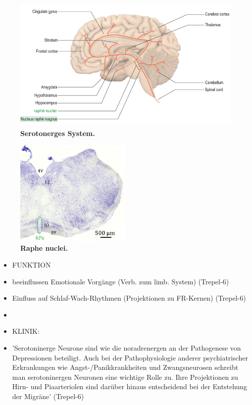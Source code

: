 \documentclass[12pt,a4paper,pdftex]{article}
\begin{document}
\begin{figure}[H]
    \centering
    \includegraphics[width=\textwidth]{pictures/Bilder_monoamine_systeme/serotonerges_system.PNG}
    \caption[Serotonerges System]{\textbf{Serotonerges System.} \textsuperscript{\cite[9]{crossman2014neuroanatomy}}}
    \label{fig:serotonerges_system}
\end{figure}{}
    
\begin{figure}[H]
    \centering
    \includegraphics[width=0.5\textwidth]{pictures/Bilder_monoamine_systeme/raphe_nuclei.png}
    \caption[Raphe nuclei]{\textbf{Raphe nuclei.} }
    \label{fig:raphe_nuclei}
\end{figure}{}


\begin{itemize}{}
    \item FUNKTION
    \item beeinflussen Emotionale Vorgänge (Verb. zum limb. System) (Trepel-6)
    \item Einfluss auf Schlaf-Wach-Rhythmen (Projektionen zu FR-Kernen) (Trepel-6)
    \item 
    \item KLINIK:
    \item 'Serotoninerge Neurone sind wie die noradrenergen an der Pathogenese von Depressionen beteiligt. Auch bei der Pathophysiologie anderer psychiatrischer Erkrankungen wie Angst-/Panikkrankheiten und Zwangsneurosen schreibt man serotoninergen Neuronen eine wichtige Rolle zu. Ihre Projektionen zu Hirn- und Piaarteriolen sind darüber hinaus entscheidend bei der Entstehung der Migräne' (Trepel-6)
\end{itemize}{}
\end{document}
